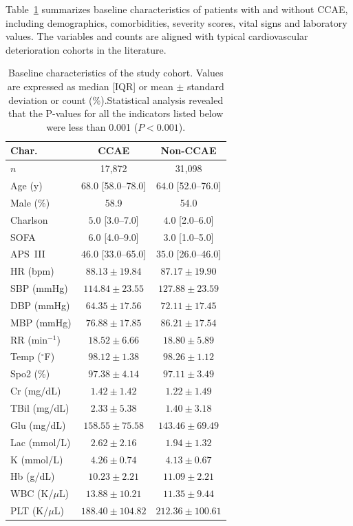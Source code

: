 \documentclass{article}
\begin{document}
Table~\ref{tab:cohort} summarizes baseline characteristics of patients with and without CCAE, including demographics, comorbidities, severity scores, vital signs and laboratory values.
The variables and counts are aligned with typical cardiovascular deterioration cohorts in the literature.

\begin{table}[t]
  \centering
  \caption{Baseline characteristics of the study cohort.
  Values are expressed as median [IQR] or mean $\pm$ standard deviation or count (\%).Statistical analysis revealed that the P-values for all the indicators listed below were less than 0.001 ($P<0.001$).}
  \label{tab:cohort}

  \begin{tabular}{lcc}  %
    \toprule
    \textbf{Char.} & \textbf{CCAE} & \textbf{Non-CCAE} \\  %
    \midrule
    $n$       & 17{,}872 & 31{,}098 \\  %
    Age (y)   & $68.0$ [58.0--78.0] & $64.0$ [52.0--76.0] \\
    Male (\%) & 58.9 & 54.0 \\
    Charlson  & $5.0$ [3.0--7.0] & $4.0$ [2.0--6.0] \\
    SOFA      & $6.0$ [4.0--9.0] & $3.0$ [1.0--5.0] \\
    APS~III   & $46.0$ [33.0--65.0] & $35.0$ [26.0--46.0] \\
    \midrule
    HR (bpm)  & $88.13 \pm 19.84$ & $87.17 \pm 19.90$ \\
    SBP (mmHg)& $114.84 \pm 23.55$ & $127.88 \pm 23.59$ \\
    DBP (mmHg)& $64.35 \pm 17.56$  & $72.11 \pm 17.45$ \\
    MBP (mmHg)& $76.88 \pm 17.85$  & $86.21 \pm 17.54$ \\
    RR (min$^{-1}$) & $18.52 \pm 6.66$ & $18.80 \pm 5.89$ \\
    Temp ($^{\circ}$F) & $98.12 \pm 1.38$ & $98.26 \pm 1.12$ \\
    Spo2 (\%)& $97.38 \pm 4.14$  & $97.11 \pm 3.49$ \\
    \midrule
    Cr (mg/dL) & $1.42 \pm 1.42$ & $1.22 \pm 1.49$ \\
    TBil (mg/dL) & $2.33 \pm 5.38$ & $1.40 \pm 3.18$ \\
    Glu (mg/dL) & $158.55 \pm 75.58$ & $143.46 \pm 69.49$ \\
    Lac (mmol/L) & $2.62 \pm 2.16$ & $1.94 \pm 1.32$ \\
    K (mmol/L) & $4.26 \pm 0.74$ & $4.13 \pm 0.67$ \\
    Hb (g/dL) & $10.23 \pm 2.21$ & $11.09 \pm 2.21$ \\
    WBC (K/$\mu$L) & $13.88 \pm 10.21$ & $11.35 \pm 9.44$ \\
    PLT (K/$\mu$L) & $188.40 \pm 104.82$ & $212.36 \pm 100.61$ \\
    \bottomrule
  \end{tabular}
\end{table}
\end{document}
